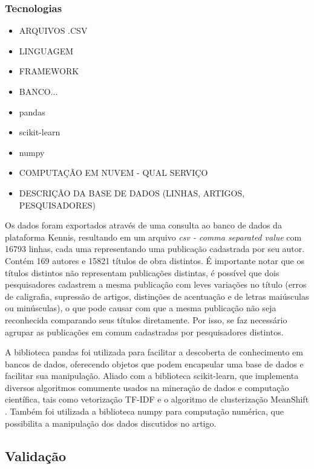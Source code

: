 \documentclass[12pt]{article}
\begin{document}
\subsubsection{Tecnologias}

\begin{itemize}
    \item ARQUIVOS .CSV
    \item LINGUAGEM
    \item FRAMEWORK
    \item BANCO...
    \item pandas
    \item scikit-learn
    \item numpy
    \item COMPUTAÇÃO EM NUVEM - QUAL SERVIÇO
    \item DESCRIÇÃO DA BASE DE DADOS (LINHAS, ARTIGOS, PESQUISADORES)
\end{itemize}

Os dados foram exportados através de uma consulta ao banco de dados da plataforma Kennis, resultando em um arquivo \textit{csv - comma separated value} com 16793 linhas, cada uma representando uma publicação cadastrada por seu autor. Contém 169 autores e 15821 títulos de obra distintos. É importante notar que os títulos distintos não representam publicações distintas, é possível que dois pesquisadores cadastrem a mesma publicação com leves variações no título (erros de caligrafia, supressão de artigos, distinções de acentuação e de letras maiúsculas ou minúsculas), o que pode causar com que a mesma publicação não seja reconhecida comparando seus títulos diretamente. Por isso, se faz necessário agrupar as publicações em comum cadastradas por pesquisadores distintos.

A biblioteca pandas foi utilizada para facilitar a descoberta de conhecimento em bancos de dados, oferecendo objetos que podem encapsular uma base de dados e facilitar sua manipulação. Aliado com a biblioteca scikit-learn, que implementa diversos algoritmos comumente usados na mineração de dados e computação científica, tais como vetorização TF-IDF e o algoritmo de clusterização MeanShift \cite{scikit-learn}. Também foi utilizada a biblioteca numpy para computação numérica, que possibilita a manipulação dos dados discutidos no artigo.

\subsection{Validação} \label{sect:validation}
\end{document}
